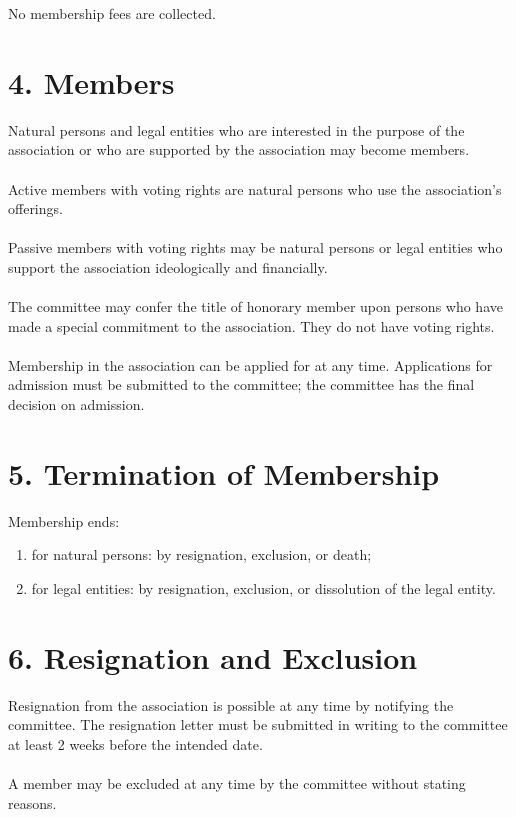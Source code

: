 \documentclass[11pt,a4paper]{article}
\begin{document}
No membership fees are collected.

\section*{4. Members}

Natural persons and legal entities who are interested in the purpose of the association or who are supported by the association may become members.
\\\\
Active members with voting rights are natural persons who use the association's offerings.
\\\\
Passive members with voting rights may be natural persons or legal entities who support the association ideologically and financially.
\\\\
The committee may confer the title of honorary member upon persons who have made a special commitment to the association. They do not have voting rights.
\\\\
Membership in the association can be applied for at any time. Applications for admission must be submitted to the committee; the committee has the final decision on admission.
\section*{5. Termination of Membership}

Membership ends:

\begin{enumerate}
    \item for natural persons: by resignation, exclusion, or death;
    \item for legal entities: by resignation, exclusion, or dissolution of the legal entity.
\end{enumerate}

\section*{6. Resignation and Exclusion}

Resignation from the association is possible at any time by notifying the committee. The resignation letter must be submitted in writing to the committee at least 2 weeks before the intended date.
\\\\
A member may be excluded at any time by the committee without stating reasons.
\end{document}
